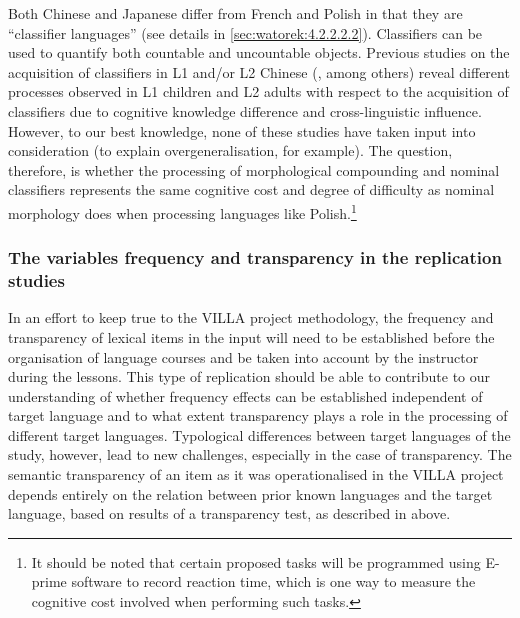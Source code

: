 \documentclass[output=paper,colorlinks,citecolor=brown,modfonts,nonflat]{../langscibook}
\begin{document}
Both Chinese and Japanese differ from French and Polish in that they are “classifier languages” (see details in \ref{sec:watorek:4.2.2.2.2}). Classifiers can be used to quantify both countable and uncountable objects. Previous studies on the acquisition of classifiers in L1 and/or L2 Chinese (\citealt{Liang2008,Gong2010,Kong2012}, among others) reveal different processes observed in L1 children and L2 adults with respect to the acquisition of classifiers due to cognitive knowledge difference and cross-linguistic influence. However, to our best knowledge, none of these studies have taken input into consideration (to explain overgeneralisation, for example). The question, therefore, is whether the processing of morphological compounding and nominal classifiers represents the same cognitive cost and degree of difficulty as nominal morphology does when processing languages like Polish.{\footnote{It should be noted that certain proposed tasks will be programmed using E-prime software to record reaction time, which is one way to measure the cognitive cost involved when performing such tasks.}}

\subsubsection{The variables frequency and transparency in the replication studies}\label{sec:watorek:4.1.2}

In an effort to keep true to the VILLA project methodology, the frequency and transparency of lexical items in the input will need to be established before the organisation of language courses and be taken into account by the instructor during the lessons. This type of replication should be able to contribute to our understanding of whether frequency effects can be established independent of target language and to what extent transparency plays a role in the processing of different target languages. Typological differences between target languages of the study, however, lead to new challenges, especially in the case of transparency. The semantic transparency of an item as it was operationalised in the VILLA project depends entirely on the relation between prior known languages and the target language, based on results of a transparency test, as described in  above.
\end{document}
